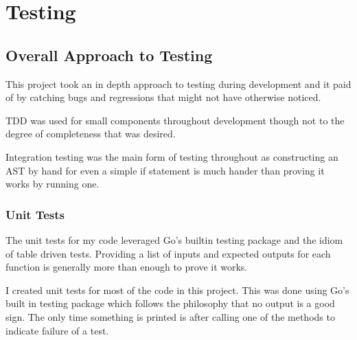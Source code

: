 \chapter{Testing}




\section{Overall Approach to Testing}
This project took an in depth approach to testing during development and it paid of by catching bugs and regressions that might not have otherwise noticed.

TDD was used for small components throughout development though not to the degree of completeness that was desired.

Integration testing was the main form of testing throughout as constructing an AST by hand for even a simple if statement is much hander than proving it works by running one.


\subsection{Unit Tests}
The unit tests for my code leveraged Go's builtin testing package and the idiom of table driven tests.
Providing a list of inputs and expected outputs for each function is generally more than enough to prove it works.

I created unit tests for most of the code in this project.
This was done using Go's built in testing package which follows the philosophy that no output is a good sign. 
The only time something is printed is after calling one of the methods to indicate failure of a test.

